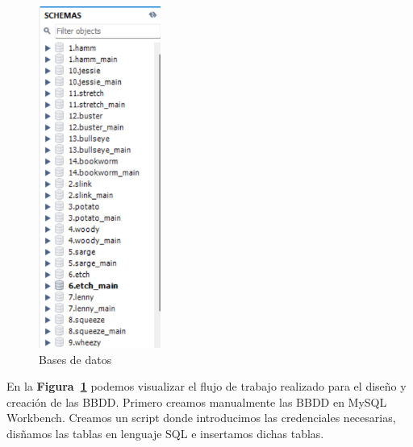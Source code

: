 \documentclass[a4paper, 12pt]{book}
\begin{document}
\begin{figure}
	\centering
	\includegraphics[width=4cm, keepaspectratio]{img/BBDDsql.png}
	\caption{Bases de datos}
	\label{fig:BBDDsql}
\end{figure}

En la \textbf {Figura~\ref{fig:BBDDsql}} podemos visualizar el flujo de trabajo realizado para el diseño y creación de las BBDD. Primero creamos manualmente las BBDD en MySQL Workbench. Creamos un script donde introducimos las credenciales necesarias, disñamos las tablas en lenguaje SQL e insertamos dichas tablas.
\end{document}
